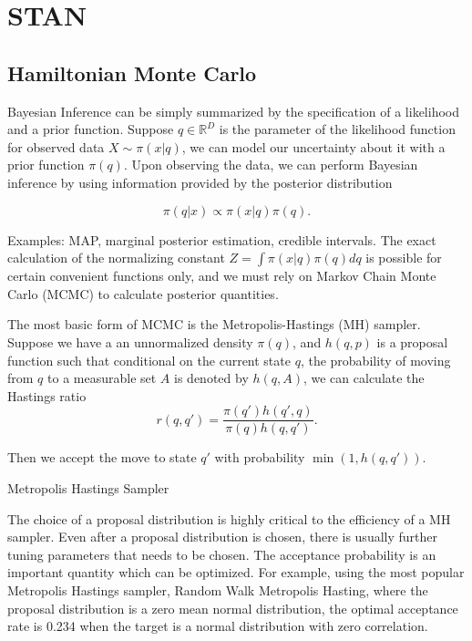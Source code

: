 \documentclass[12pt]{report}
\begin{document}
\chapter{STAN}
\section{Hamiltonian Monte Carlo}

Bayesian Inference can be simply summarized by the specification of a likelihood and a prior function. Suppose $q \in \mathbb{R}^D$ is the parameter of the likelihood function for observed data $X \sim \pi(x|q)$, we can
model our uncertainty about it with a prior function $\pi(q)$. Upon observing the data, we can perform Bayesian inference by using information provided by the posterior distribution 

\[ \pi(q | x ) \propto \pi(x | q) \pi(q) .\]

Examples: MAP, marginal posterior estimation, credible intervals. The exact calculation of the normalizing constant $Z = \int \pi(x | q) \pi(q) dq $ is possible for certain convenient functions only, and we must rely on Markov Chain Monte Carlo (MCMC) to calculate posterior quantities. 


The most basic form of MCMC is the Metropolis-Hastings (MH) sampler. Suppose we have a an unnormalized density $\pi(q)$, and $h(q,p)$ is a proposal function such that conditional on the current state $q$, the probability of moving from $q$ to a measurable set $A$ is denoted by $h(q,A)$, we can calculate the Hastings ratio
\[ r(q,q') = \frac{\pi(q')h(q',q)}{\pi(q)h(q,q')}. \]

Then we accept the move to state $q'$ with probability $ \min (1, h(q,q')) $.

\begin{algorithm}
\caption{Metropolis Hastings Sampler}


 
 
\end{algorithm}


The choice of a proposal distribution is highly critical to the efficiency of a MH sampler. Even after a proposal distribution is chosen, there is usually further tuning parameters that needs to be chosen. The acceptance probability is an important quantity which 
can be optimized. For example, using the most popular Metropolis Hastings sampler, Random Walk Metropolis Hasting, where the proposal distribution is a zero mean normal distribution,
the optimal acceptance rate is 0.234 when the target is a normal distribution with zero correlation.\cite{roberts1997weak,gelman1996efficient,roberts2001optimal} 
\end{document}
